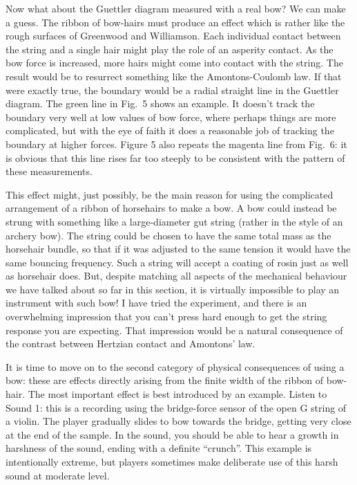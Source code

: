   Now what about the Guettler diagram measured with a real bow? We can make a 
  guess. The ribbon of bow-hairs must produce an effect which is rather like 
  the rough surfaces of Greenwood and Williamson. Each individual contact 
  between the string and a single hair might play the role of an asperity 
  contact. As the bow force is increased, more hairs might come into contact 
  with the string. The result would be to resurrect something like the 
  Amontons-Coulomb law. If that were exactly true, the boundary would be a 
  radial straight line in the Guettler diagram. The green line in Fig.\ 5 shows 
  an example. It doesn’t track the boundary very well at low values of bow 
  force, where perhaps things are more complicated, but with the eye of faith 
  it does a reasonable job of tracking the boundary at higher forces. Figure 5 
  also repeats the magenta line from Fig.\ 6: it is obvious that this line 
  rises far too steeply to be consistent with the pattern of these 
  measurements. 

  This effect might, just possibly, be the main reason for using the 
  complicated arrangement of a ribbon of horsehairs to make a bow. A bow could 
  instead be strung with something like a large-diameter gut string (rather in 
  the style of an archery bow). The string could be chosen to have the same 
  total mass as the horsehair bundle, so that if it was adjusted to the same 
  tension it would have the same bouncing frequency. Such a string will accept 
  a coating of rosin just as well as horsehair does. But, despite matching all 
  aspects of the mechanical behaviour we have talked about so far in this 
  section, it is virtually impossible to play an instrument with such bow! I 
  have tried the experiment, and there is an overwhelming impression that you 
  can’t press hard enough to get the string response you are expecting. That 
  impression would be a natural consequence of the contrast between Hertzian 
  contact and Amontons' law. 

  It is time to move on to the second category of physical consequences of 
  using a bow: these are effects directly arising from the finite width of the 
  ribbon of bow-hair. The most important effect is best introduced by an 
  example. Listen to Sound 1: this is a recording using the bridge-force sensor 
  of the open G string of a violin. The player gradually slides to bow towards 
  the bridge, getting very close at the end of the sample. In the sound, you 
  should be able to hear a growth in harshness of the sound, ending with a 
  definite “crunch”. This example is intentionally extreme, but players 
  sometimes make deliberate use of this harsh sound at moderate level. 

